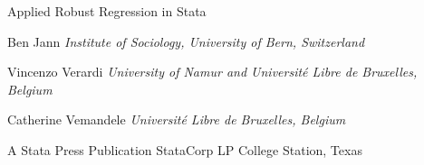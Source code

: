 {

\noindent
{\Huge
Applied Robust Regression in Stata

}

\vfill

\noindent
Ben Jann\hfil\break
{\it Institute of Sociology, University of Bern, Switzerland}

\bigskip

\noindent
Vincenzo Verardi\hfil\break
{\it University of Namur and Universit\'{e} Libre de Bruxelles, Belgium}

\bigskip

\noindent
Catherine Vemandele\hfil\break
{\it Universit\'{e} Libre de Bruxelles, Belgium}

\vfill

\noindent
{}

\noindent
A Stata Press Publication\hfil\break
StataCorp LP\hfil\break
College Station, Texas

}
\endinput
